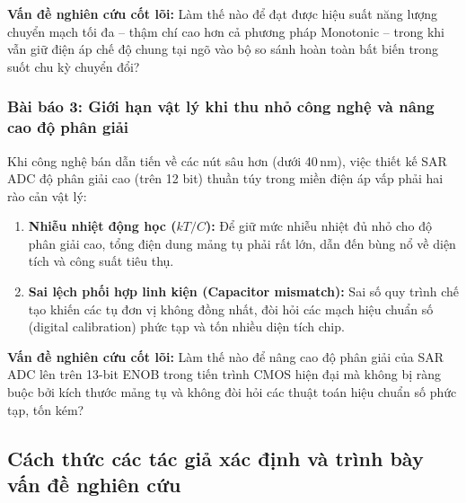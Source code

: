 \documentclass[12pt,a4paper]{article}
\begin{document}
\textbf{Vấn đề nghiên cứu cốt lõi:} Làm thế nào để đạt được hiệu suất năng lượng chuyển mạch tối đa -- thậm chí cao hơn cả phương pháp Monotonic -- trong khi vẫn giữ điện áp chế độ chung tại ngõ vào bộ so sánh hoàn toàn bất biến trong suốt chu kỳ chuyển đổi?

\subsubsection{Bài báo 3: Giới hạn vật lý khi thu nhỏ công nghệ và nâng cao độ phân giải}
Khi công nghệ bán dẫn tiến về các nút sâu hơn (dưới 40\,nm), việc thiết kế SAR ADC độ phân giải cao (trên 12 bit) thuần túy trong miền điện áp vấp phải hai rào cản vật lý:
\begin{enumerate}
    \item \textbf{Nhiễu nhiệt động học ($kT/C$):} Để giữ mức nhiễu nhiệt đủ nhỏ cho độ phân giải cao, tổng điện dung mảng tụ phải rất lớn, dẫn đến bùng nổ về diện tích và công suất tiêu thụ.
    \item \textbf{Sai lệch phối hợp linh kiện (Capacitor mismatch):} Sai số quy trình chế tạo khiến các tụ đơn vị không đồng nhất, đòi hỏi các mạch hiệu chuẩn số (digital calibration) phức tạp và tốn nhiều diện tích chip.
\end{enumerate}

\textbf{Vấn đề nghiên cứu cốt lõi:} Làm thế nào để nâng cao độ phân giải của SAR ADC lên trên 13-bit ENOB trong tiến trình CMOS hiện đại mà không bị ràng buộc bởi kích thước mảng tụ và không đòi hỏi các thuật toán hiệu chuẩn số phức tạp, tốn kém?

\subsection{Cách thức các tác giả xác định và trình bày vấn đề nghiên cứu}
\end{document}
